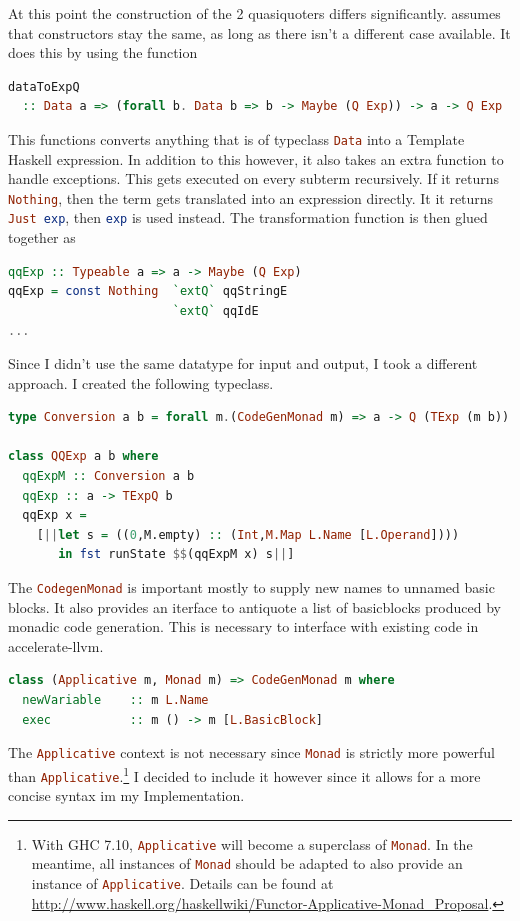 \documentclass[a4paper,bibliography=totocnumbered,parskip,headsepline]{scrbook}
\begin{document}
At this point the construction of the 2 quasiquoters differs significantly.
 assumes that constructors stay the same, as long as there isn't a different case available.
It does this by using the function
\begin{lstlisting}[language=haskell]
dataToExpQ
  :: Data a => (forall b. Data b => b -> Maybe (Q Exp)) -> a -> Q Exp
\end{lstlisting}
This functions converts anything that is of typeclass \lstinline[language=haskell]!Data! into a Template Haskell expression.
In addition to this however, it also takes an extra function to handle exceptions.
This gets executed on every subterm recursively.
If it returns \lstinline[language=haskell]!Nothing!, then the term gets translated into an expression directly.
It it returns \lstinline[language=haskell]!Just exp!, then \lstinline[language=haskell]!exp! is used instead.
The transformation function is then glued together as
\begin{lstlisting}[language=haskell]
qqExp :: Typeable a => a -> Maybe (Q Exp)
qqExp = const Nothing  `extQ` qqStringE
                       `extQ` qqIdE
...
\end{lstlisting}
Since I didn't use the same datatype for input and output, I took a different approach.
I created the following typeclass.
\begin{lstlisting}[language=haskell]
type Conversion a b = forall m.(CodeGenMonad m) => a -> Q (TExp (m b))

class QQExp a b where
  qqExpM :: Conversion a b
  qqExp :: a -> TExpQ b
  qqExp x =
    [||let s = ((0,M.empty) :: (Int,M.Map L.Name [L.Operand])))
       in fst runState $$(qqExpM x) s||]
\end{lstlisting}
The \lstinline[language=haskell]!CodegenMonad! is important mostly to supply new names to unnamed basic blocks.
It also provides an iterface to antiquote a list of basicblocks produced by monadic code generation.
This is necessary to interface with existing code in accelerate-llvm.
\begin{lstlisting}[language=haskell]
class (Applicative m, Monad m) => CodeGenMonad m where
  newVariable    :: m L.Name
  exec           :: m () -> m [L.BasicBlock]
\end{lstlisting}
The \lstinline[language=haskell]!Applicative! context is not necessary since \lstinline[language=haskell]!Monad! is strictly more powerful than \lstinline[language=haskell]!Applicative!.\footnote{With GHC 7.10, \lstinline[language=haskell]!Applicative! will become a superclass of \lstinline[language=haskell]!Monad!.
In the meantime, all instances of \lstinline[language=haskell]!Monad! should be adapted to also provide an instance of \lstinline[language=haskell]!Applicative!.
Details can be found at \url{http://www.haskell.org/haskellwiki/Functor-Applicative-Monad_Proposal}.}
I decided to include it however since it allows for a more concise syntax im my Implementation.
\end{document}
